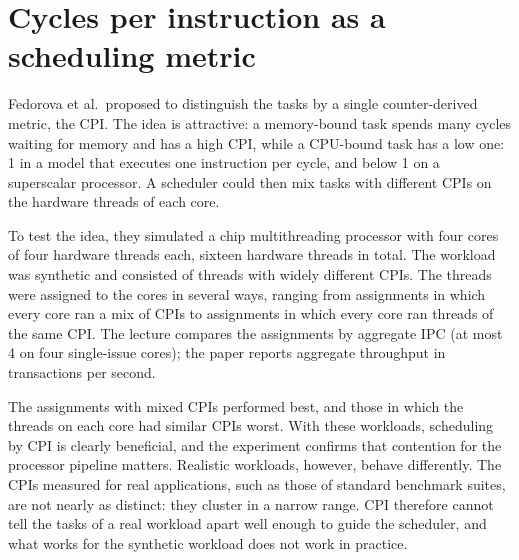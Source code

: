 \documentclass[../main.tex]{subfiles}
\begin{document}
\section{Cycles per instruction as a scheduling metric}
\label{sec:l07-cpi}

Fedorova et al.\ proposed to distinguish the tasks by a single
counter-derived metric, the CPI.  The idea is attractive: a
memory-bound task spends many cycles waiting for memory and has a high CPI,
while a CPU-bound task has a low one: 1 in a model that executes one
instruction per cycle, and below 1 on a superscalar processor.  A scheduler could then mix
tasks with different CPIs on the hardware threads of each core.

To test the idea, they simulated a chip multithreading processor with four
cores of four hardware threads each, sixteen hardware threads in total.  The
workload was synthetic and consisted of threads with widely different CPIs.
The threads were assigned to the cores in several ways, ranging from
assignments in which every core ran a mix of CPIs to assignments in which
every core ran threads of the same CPI.  The lecture compares the
assignments by aggregate IPC (at most 4 on four single-issue cores); the
paper reports aggregate throughput in transactions per second.

The assignments with mixed CPIs performed best, and those in
which the threads on each core had similar CPIs worst.  With these
workloads, scheduling by CPI is clearly beneficial, and the experiment
confirms that contention for the processor pipeline matters.  Realistic
workloads, however, behave differently.  The CPIs measured for real
applications, such as those of standard benchmark suites, are not nearly as
distinct: they cluster in a narrow range.  CPI therefore
cannot tell the tasks of a real
workload apart well enough to guide the scheduler, and what works for the
synthetic workload does not work in practice.
\end{document}
